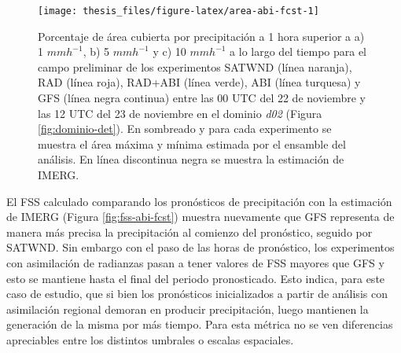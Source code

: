 \documentclass[12pt,oneside,a4paper]{reedthesis}
\begin{document}
\begin{figure}
\texttt{[image: thesis\_files/figure-latex/area-abi-fcst-1]} \caption{Porcentaje de área cubierta por precipitación a 1 hora superior a a) 1 \(mmh^{-1}\), b) 5 \(mmh^{-1}\) y c) 10 \(mmh^{-1}\) a lo largo del tiempo para el campo preliminar de los experimentos SATWND (línea naranja), RAD (línea roja), RAD+ABI (línea verde), ABI (línea turquesa) y GFS (línea negra continua) entre las 00 UTC del 22 de noviembre y las 12 UTC del 23 de noviembre en el dominio \emph{d02} (Figura \ref{fig:dominio-det}). En sombreado y para cada experimento se muestra el área máxima y mínima estimada por el ensamble del análisis. En línea discontinua negra se muestra la estimación de IMERG.}\label{fig:area-abi-fcst}
\end{figure}
El FSS calculado comparando los pronósticos de precipitación con la estimación de IMERG (Figura \ref{fig:fss-abi-fcst}) muestra nuevamente que GFS representa de manera más precisa la precipitación al comienzo del pronóstico, seguido por SATWND. Sin embargo con el paso de las horas de pronóstico, los experimentos con asimilación de radianzas pasan a tener valores de FSS mayores que GFS y esto se mantiene hasta el final del periodo pronosticado. Esto indica, para este caso de estudio, que si bien los pronósticos inicializados a partir de análisis con asimilación regional demoran en producir precipitación, luego mantienen la generación de la misma por más tiempo. Para esta métrica no se ven diferencias apreciables entre los distintos umbrales o escalas espaciales.
\end{document}
